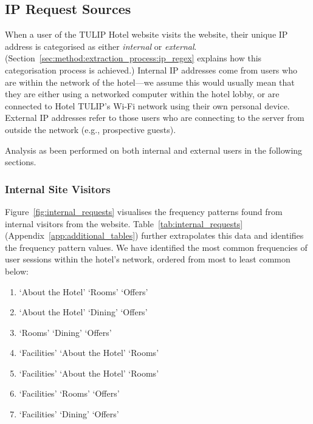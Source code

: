 \subsection{IP Request Sources}
\label{sec:results:ip_source}

When a user of the TULIP Hotel website visits the website, their unique IP address is categorised as either \textit{internal} or \textit{external}. (Section~\ref{sec:method:extraction_process:ip_regex} explains how this categorisation process is achieved.) Internal IP addresses come from users who are within the network of the hotel---we assume this would usually mean that they are either using a networked computer within the hotel lobby, or are connected to Hotel TULIP's Wi-Fi network using their own personal device. External IP addresses refer to those users who are connecting to the server from outside the network (e.g., prospective guests).

Analysis as been performed on both internal and external users in the following sections.

\subsubsection{Internal Site Visitors}
\label{sec:results:ip_source:internal}

Figure~\ref{fig:internal_requests} visualises the frequency patterns found from internal visitors from the website. Table~\ref{tab:internal_requests} (Appendix~\ref{app:additional_tables}) further extrapolates this data and identifies the frequency pattern values. We have identified the most common frequencies of user sessions within the hotel's network, ordered from most to least common below:

\begin{enumerate}
  \item `About the Hotel' \ra{} `Rooms' \ra{} `Offers'
  \item `About the Hotel' \ra{} `Dining' \ra{} `Offers'
  \item `Rooms' \ra{} `Dining' \ra{} `Offers'
  \item `Facilities' \ra{} `About the Hotel' \ra{} `Rooms'
  \item `Facilities' \ra{} `About the Hotel' \ra{} `Rooms'
  \item `Facilities' \ra{} `Rooms' \ra{} `Offers'
  \item `Facilities' \ra{} `Dining' \ra{} `Offers'
\end{enumerate}

